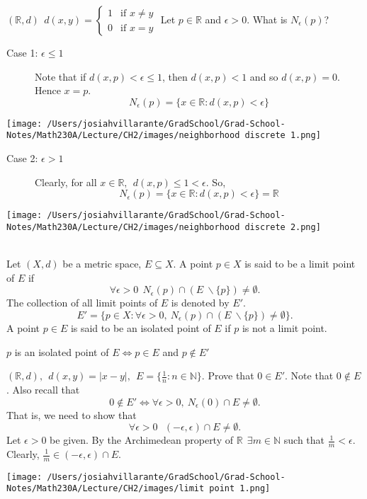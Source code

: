 \begin{example}
    $(\mathbb{R}, d) ~~d(x,y) = \begin{cases}1 &\text{if } x\not = y \\ 0 &\text{if } x=y \end{cases}$
    Let $p \in \mathbb{R}$ and $\epsilon > 0$. What is $N_\epsilon (p)$?
    \begin{description}
        \item[Case 1: $\epsilon \leq 1$] Note that if $d(x,p) < \epsilon \leq 1$, then $d(x,p) < 1$ and so $d(x,p) = 0$. Hence $x=p$.
        $$N_\epsilon (p) = \{x \in \mathbb{R} : d(x,p) < \epsilon \}$$
    \end{description}
    \texttt{[image: /Users/josiahvillarante/GradSchool/Grad-School-Notes/Math230A/Lecture/CH2/images/neighborhood discrete 1.png]}
    
    \begin{description}
        \item[Case 2: $\epsilon > 1$] Clearly, for all $x\in \mathbb{R}, ~~d(x,p) \leq 1 < \epsilon$.
        So,
        $$N_\epsilon (p) = \{x \in \mathbb{R} : d(x,p) < \epsilon\} = \mathbb{R}$$
    \end{description}
    \texttt{[image: /Users/josiahvillarante/GradSchool/Grad-School-Notes/Math230A/Lecture/CH2/images/neighborhood discrete 2.png]}
\end{example}

\begin{definition} \leavevmode \\
    Let $(X, d)$ be a metric space, $E \subseteq X$. A point $p\in X$ is said to be a limit point of $E$ if $$\forall \epsilon > 0 ~~N_\epsilon (p) \cap (E ~\backslash \{p\}) \not = \emptyset.$$The collection of all limit points of $E$ is denoted by $E'$. $$E'=\{p\in X : \forall \epsilon > 0, ~N_\epsilon (p)\cap (E ~\backslash \{p\}) \not = \emptyset\}.$$A point $p\in E$ is said to be an isolated point of $E$ if $p$ is not a limit point.
\end{definition}

\begin{note}
     $p$ is an isolated point of $E \iff p\in E$ and $p\not \in E'$
\end{note}

\begin{example}
    $(\mathbb{R}, d), ~~d(x,y) = |x-y|, ~~E=\{\frac{1}{n} : n \in \mathbb{N} \}$. Prove that $0 \in E'.$
    Note that $0 \not \in E$. Also recall that
    $$0 \not \in E' \iff \forall \epsilon > 0, ~N_\epsilon(0) \cap E \not = \emptyset.$$
    That is, we need to show that
    $$\forall \epsilon > 0 ~~~(-\epsilon, \epsilon)\cap E \not = \emptyset.$$
    Let $\epsilon > 0$ be given. By the Archimedean property of $\mathbb{R} ~~\exists m\in \mathbb{N}$ such that $\frac{1}{m} < \epsilon.$ Clearly, $\frac{1}{m} \in (-\epsilon, \epsilon) \cap E$. 

    \texttt{[image: /Users/josiahvillarante/GradSchool/Grad-School-Notes/Math230A/Lecture/CH2/images/limit point 1.png]}
\end{example}

